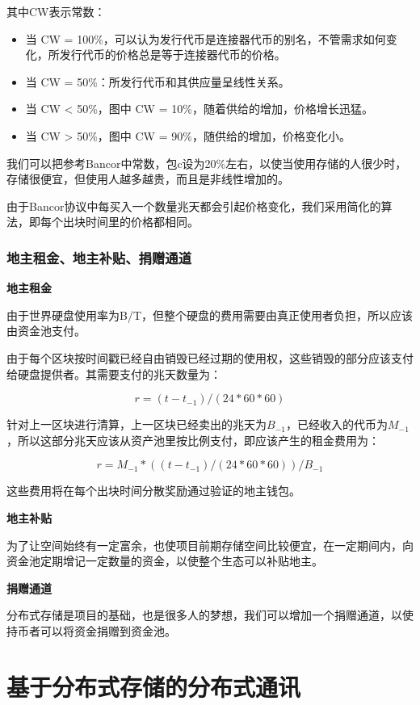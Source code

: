 \documentclass[a4paper,12pt]{article}
\begin{document}
其中CW表示常数：

\begin{itemize}
\item 当 CW = 100\%，可以认为发行代币是连接器代币的别名，不管需求如何变化，所发行代币的价格总是等于连接器代币的价格。
\item 当 CW = 50\%：所发行代币和其供应量呈线性关系。
\item 当 CW < 50\%，图中 CW = 10\%，随着供给的增加，价格增长迅猛。
\item 当 CW > 50\%，图中 CW = 90\%，随供给的增加，价格变化小。
\end{itemize}

我们可以把参考Bancor中常数，包c设为20\%左右，以使当使用存储的人很少时，存储很便宜，但使用人越多越贵，而且是非线性增加的。

由于Bancor协议中每买入一个数量兆天都会引起价格变化，我们采用简化的算法，即每个出块时间里的价格都相同。

\subsubsection{地主租金、地主补贴、捐赠通道}

\textbf{地主租金}

由于世界硬盘使用率为B/T，但整个硬盘的费用需要由真正使用者负担，所以应该由资金池支付。

由于每个区块按时间戳已经自由销毁已经过期的使用权，这些销毁的部分应该支付给硬盘提供者。其需要支付的兆天数量为：

$$r=(t-t_{-1})/(24*60*60)$$

针对上一区块进行清算，上一区块已经卖出的兆天为$B_{-1}$，已经收入的代币为$M_{-1}$，所以这部分兆天应该从资产池里按比例支付，即应该产生的租金费用为：

$$r=M_{-1}*((t-t_{-1})/(24*60*60))/B_{-1}$$

这些费用将在每个出块时间分散奖励通过验证的地主钱包。

\textbf{地主补贴}

为了让空间始终有一定富余，也使项目前期存储空间比较便宜，在一定期间内，向资金池定期增记一定数量的资金，以使整个生态可以补贴地主。

\textbf{捐赠通道}

分布式存储是项目的基础，也是很多人的梦想，我们可以增加一个捐赠通道，以使持币者可以将资金捐赠到资金池。

\section{基于分布式存储的分布式通讯}
\end{document}
